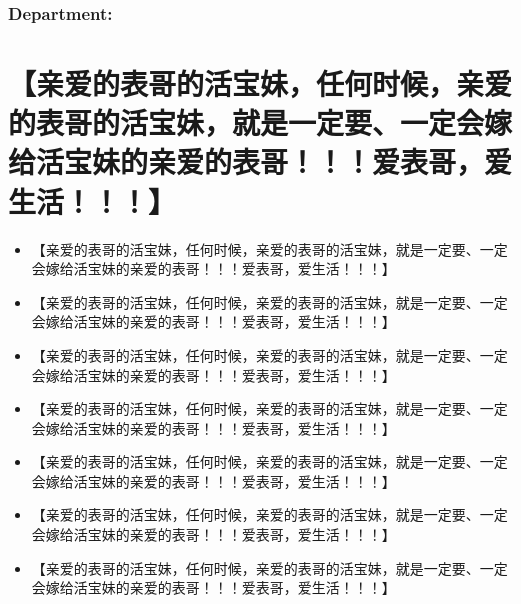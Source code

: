 \documentclass[9pt, b5paper]{article}
\begin{document}
\subsubsection{Department:}
\label{sec-3-4-2}

\section{【亲爱的表哥的活宝妹，任何时候，亲爱的表哥的活宝妹，就是一定要、一定会嫁给活宝妹的亲爱的表哥！！！爱表哥，爱生活！！！】}
\label{sec-4}
\begin{itemize}
\item 【亲爱的表哥的活宝妹，任何时候，亲爱的表哥的活宝妹，就是一定要、一定会嫁给活宝妹的亲爱的表哥！！！爱表哥，爱生活！！！】
\item 【亲爱的表哥的活宝妹，任何时候，亲爱的表哥的活宝妹，就是一定要、一定会嫁给活宝妹的亲爱的表哥！！！爱表哥，爱生活！！！】
\item 【亲爱的表哥的活宝妹，任何时候，亲爱的表哥的活宝妹，就是一定要、一定会嫁给活宝妹的亲爱的表哥！！！爱表哥，爱生活！！！】
\item 【亲爱的表哥的活宝妹，任何时候，亲爱的表哥的活宝妹，就是一定要、一定会嫁给活宝妹的亲爱的表哥！！！爱表哥，爱生活！！！】
\item 【亲爱的表哥的活宝妹，任何时候，亲爱的表哥的活宝妹，就是一定要、一定会嫁给活宝妹的亲爱的表哥！！！爱表哥，爱生活！！！】
\item 【亲爱的表哥的活宝妹，任何时候，亲爱的表哥的活宝妹，就是一定要、一定会嫁给活宝妹的亲爱的表哥！！！爱表哥，爱生活！！！】
\item 【亲爱的表哥的活宝妹，任何时候，亲爱的表哥的活宝妹，就是一定要、一定会嫁给活宝妹的亲爱的表哥！！！爱表哥，爱生活！！！】
\end{itemize}
\end{document}
